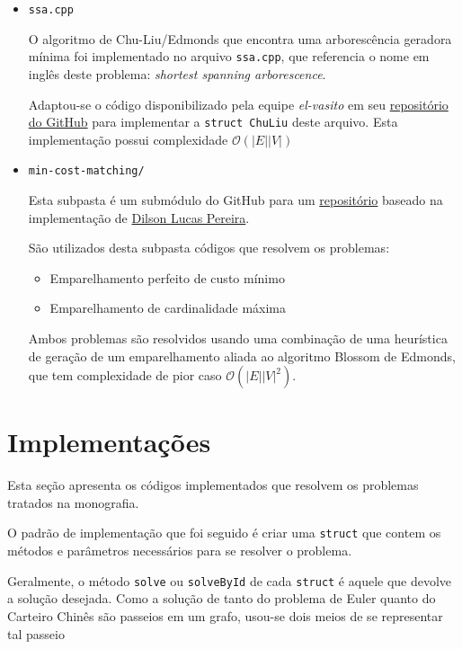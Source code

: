 \begin{itemize}
    \item \texttt{ssa.cpp}

        O algoritmo de Chu-Liu/Edmonds que encontra uma arborescência geradora mínima foi implementado no arquivo \texttt{ssa.cpp}, que referencia o nome em inglês deste problema: \textit{shortest spanning arborescence}.

        Adaptou-se o código disponibilizado pela equipe \textit{el-vasito} em seu \href{https://github.com/mhunicken/icpc-team-notebook-el-vasito}{repositório do GitHub} para implementar a \texttt{struct ChuLiu} deste arquivo.
        Esta implementação possui complexidade $\mathcal{O}(|E||V|)$

    \item \texttt{min-cost-matching/}

        Esta subpasta é um submódulo do GitHub para um \href{https://github.com/gafeol/Minimum-Cost-Perfect-Matching}{repositório} baseado na implementação de \href{https://github.com/dilsonpereira/Minimum-Cost-Perfect-Matching}{Dilson Lucas Pereira}.

        São utilizados desta subpasta códigos que resolvem os problemas:
        \begin{itemize}
            \item Emparelhamento perfeito de custo mínimo 
            \item Emparelhamento de cardinalidade máxima
        \end{itemize}

        Ambos problemas são resolvidos usando uma combinação de uma heurística de geração de um emparelhamento aliada ao algoritmo Blossom de Edmonds, que tem complexidade de pior caso $\mathcal{O}(|E||V|^2)$.

\end{itemize}

\section{Implementações}

Esta seção apresenta os códigos implementados que resolvem os problemas tratados na monografia.

O padrão de implementação que foi seguido é criar uma \texttt{struct} que contem os métodos e parâmetros necessários para se resolver o problema.

Geralmente, o método \texttt{solve} ou \texttt{solveById} de cada \texttt{struct} é aquele que devolve a solução desejada.
Como a solução de tanto do problema de Euler quanto do Carteiro Chinês são passeios em um grafo, usou-se dois meios de se representar tal passeio

